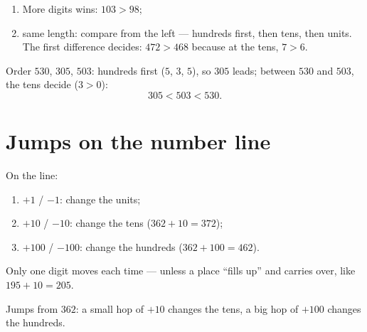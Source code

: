 \begin{method}\label{met:g2:numbers:compare}
\begin{enumerate}
  \item More digits wins: $103 > 98$;
  \item same length: compare from the left --- hundreds first, then
        tens, then units. The first difference decides:
        $472 > 468$ because at the tens, $7 > 6$.
\end{enumerate}
\end{method}

\begin{example}\label{ex:g2:numbers:order}
Order $530$, $305$, $503$: hundreds first ($5$, $3$, $5$), so
$305$ leads; between $530$ and $503$, the tens decide ($3 > 0$):
\[
305 < 503 < 530 .
\]
\end{example}

\section{Jumps on the number line}

\begin{method}\label{met:g2:numbers:jumps}
On the line:
\begin{enumerate}
  \item $+1$ / $-1$: change the units;
  \item $+10$ / $-10$: change the tens ($362 + 10 = 372$);
  \item $+100$ / $-100$: change the hundreds ($362 + 100 = 462$).
\end{enumerate}
Only one digit moves each time --- unless a place ``fills up'' and
carries over, like $195 + 10 = 205$.
\end{method}

\begin{omfigure}

{\small Jumps from $362$: a small hop of $+10$ changes the tens, a
big hop of $+100$ changes the hundreds.}
\end{omfigure}

